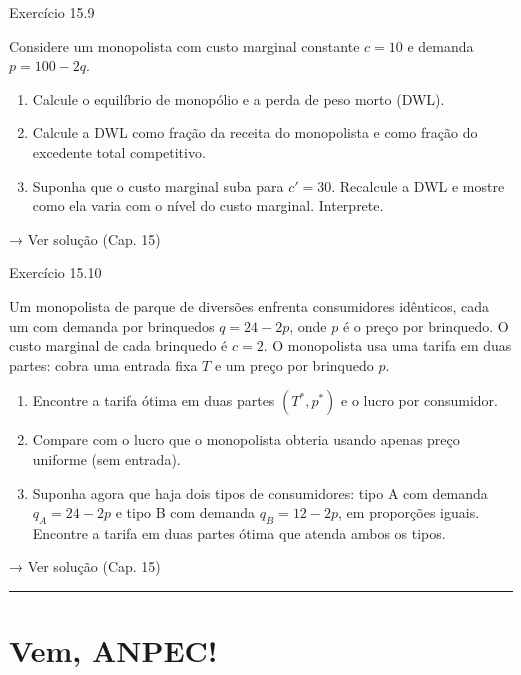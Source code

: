 \documentclass[11pt,twoside,openright]{book}
\begin{document}
\begin{exresolvidobox}{Exercício 15.9}

Considere um monopolista com custo marginal constante \(c = 10\) e
demanda \(p = 100 - 2q\).

\begin{enumerate}
\def\labelenumi{\alph{enumi})}
\item
  Calcule o equilíbrio de monopólio e a perda de peso morto (DWL).
\item
  Calcule a DWL como fração da receita do monopolista e como fração do
  excedente total competitivo.
\item
  Suponha que o custo marginal suba para \(c' = 30\). Recalcule a DWL e
  mostre como ela varia com o nível do custo marginal. Interprete.
\end{enumerate}

→ Ver solução (Cap. 15)

\end{exresolvidobox}

\begin{exresolvidobox}{Exercício 15.10}

Um monopolista de parque de diversões enfrenta consumidores idênticos,
cada um com demanda por brinquedos \(q = 24 - 2p\), onde \(p\) é o preço
por brinquedo. O custo marginal de cada brinquedo é \(c = 2\). O
monopolista usa uma tarifa em duas partes: cobra uma entrada fixa \(T\)
e um preço por brinquedo \(p\).

\begin{enumerate}
\def\labelenumi{\alph{enumi})}
\item
  Encontre a tarifa ótima em duas partes \((T^*, p^*)\) e o lucro por
  consumidor.
\item
  Compare com o lucro que o monopolista obteria usando apenas preço
  uniforme (sem entrada).
\item
  Suponha agora que haja dois tipos de consumidores: tipo A com demanda
  \(q_A = 24 - 2p\) e tipo B com demanda \(q_B = 12 - 2p\), em
  proporções iguais. Encontre a tarifa em duas partes ótima que atenda
  ambos os tipos.
\end{enumerate}

→ Ver solução (Cap. 15)

\end{exresolvidobox}

\begin{center}\rule{0.5\linewidth}{0.5pt}\end{center}

\section{Vem, ANPEC!}\label{vem-anpec-1}
\end{document}
